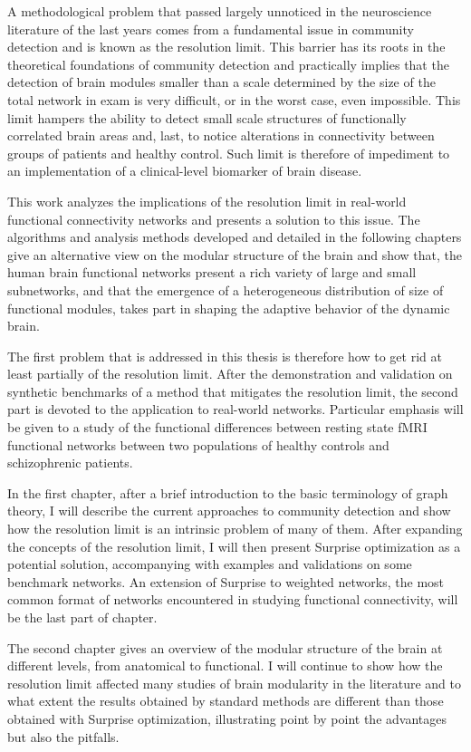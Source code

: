 A methodological problem that passed largely unnoticed in the neuroscience literature of the last years comes from a fundamental issue in community detection and is known as the resolution limit. This barrier has its roots in the theoretical foundations of community detection and practically implies that the detection of brain modules smaller than a scale determined by the size of the total network in exam is very difficult, or in the worst case, even impossible. This limit hampers the ability to detect small scale structures of functionally correlated brain areas and, last, to notice alterations in connectivity between groups of patients and healthy control. Such limit is therefore of impediment to an implementation of a clinical-level biomarker of brain disease.

This work analyzes the implications of the resolution limit in real-world functional connectivity networks and presents a solution to this issue.
The algorithms and analysis methods developed and detailed in the following chapters give an alternative view on the modular structure of the brain and show that, the human brain functional networks present a rich variety of large and small subnetworks, and that the emergence of a heterogeneous distribution of size of functional modules, takes part in shaping the adaptive behavior of the dynamic brain.

The first problem that is addressed in this thesis is therefore how to get rid at least partially of the resolution limit. 
After the demonstration and validation on synthetic benchmarks of a method that mitigates the resolution limit, the second part is devoted to the application to real-world networks. Particular emphasis will be given to a study of the functional differences between resting state fMRI functional networks between two populations of healthy controls and schizophrenic patients. 

In the first chapter, after a brief introduction to the basic terminology of graph theory, I will describe the current approaches to community detection and show how the resolution limit is an intrinsic problem of many of them. After expanding the concepts of the resolution limit, I will then present Surprise optimization as a potential solution, accompanying with examples and validations on some benchmark networks. An extension of Surprise to weighted networks, the most common format of networks encountered in studying functional connectivity, will be the last part of chapter.

The second chapter gives an overview of the modular structure of the brain at different levels, from anatomical to functional. I will continue to show how the resolution limit affected many studies of brain modularity in the literature and to what extent the results obtained by standard methods are different than those obtained with Surprise optimization, illustrating point by point the advantages but also the pitfalls.

